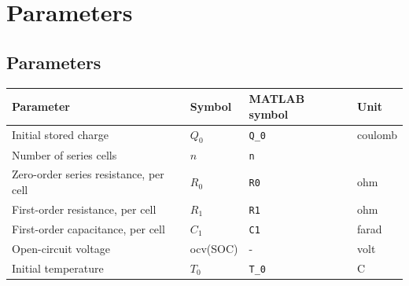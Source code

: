 \documentclass{article}
\begin{document}

		
		

\section{Parameters}
	\subsection{Parameters}
	\begin{tabular}{ l | l | l | l }
		Parameter						&	Symbol		& MATLAB symbol	&	Unit		\\	\hline
		Initial stored charge					&	$Q_0$		& \texttt{Q\_0}		&	coulomb	\\
		Number of series cells				&	$n$			& \texttt{n}		&			\\
		Zero-order series resistance, per cell	&	$R_0$		& \texttt{R0}		&	ohm		\\
		First-order resistance, per cell			&	$R_1$		& \texttt{R1}		& 	ohm		\\
		First-order capacitance, per cell		&	$C_1$		& \texttt{C1}		&	farad	\\
		Open-circuit voltage					&	ocv(SOC)		& -				&	volt		\\
		Initial temperature					&	$T_0$		& \texttt{T\_0}		&	\degree C \\
		
	\end{tabular}
	
\end{document}
